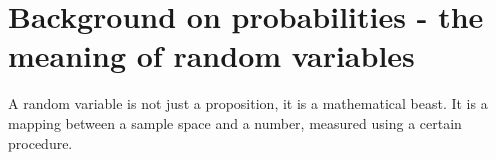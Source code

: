 \section{Background on probabilities - the meaning of random variables}

A random variable is not just a proposition, it is a mathematical beast. It is a mapping between a sample space and a number, measured using a certain procedure. 

 



